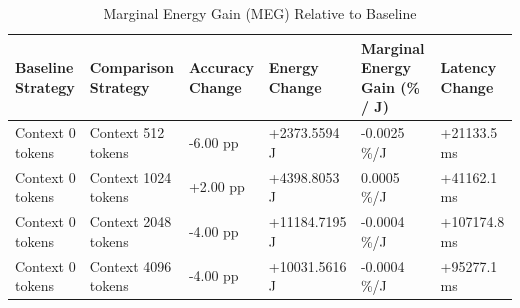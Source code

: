 \begin{table}
\caption{Marginal Energy Gain (MEG) Relative to Baseline}
\label{tab:marginal_energy_gain}
\begin{tabular}{llllll}
\toprule
Baseline Strategy & Comparison Strategy & Accuracy Change & Energy Change & Marginal Energy Gain (\% / J) & Latency Change \\
\midrule
Context 0 tokens & Context 512 tokens & -6.00 pp & +2373.5594 J & -0.0025 \%/J & +21133.5 ms \\
Context 0 tokens & Context 1024 tokens & +2.00 pp & +4398.8053 J & 0.0005 \%/J & +41162.1 ms \\
Context 0 tokens & Context 2048 tokens & -4.00 pp & +11184.7195 J & -0.0004 \%/J & +107174.8 ms \\
Context 0 tokens & Context 4096 tokens & -4.00 pp & +10031.5616 J & -0.0004 \%/J & +95277.1 ms \\
\bottomrule
\end{tabular}
\end{table}
